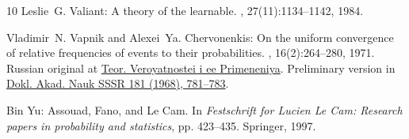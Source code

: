 \documentclass[11pt]{article}
\begin{document}
\begin{thebibliography}{10}
{\sc Leslie~G. Valiant}: A theory of the learnable.
, 27(11):1134--1142, 1984.
\newblock [\epfmtdoi{10.1145/1968.1972}]

{\sc Vladimir~N. Vapnik and Alexei~Ya. Chervonenkis}: On the uniform
  convergence of relative frequencies of events to their probabilities.
, 16(2):264--280, 1971.
\newblock Russian original at
  \href{https://www.mathnet.ru/links/3704b04dde93ca91eab24902517ad339/tvp2146.pdf}{Teor.
  Veroyatnostei i ee Primeneniya}. Preliminary version in
  \href{https://www.ams.org/mathscinet-getitem?mr=0231431}{Dokl. Akad. Nauk
  SSSR 181 (1968), 781--783}.
\newblock [\epfmtdoi{10.1137/1116025}]

{\sc Bin Yu}: {A}ssouad, {F}ano, and {L}e {C}am.
\newblock In {\em {F}estschrift for {L}ucien {L}e {C}am: {R}esearch papers in
  probability and statistics}, pp. 423--435. Springer, 1997.
\newblock [\epfmtdoi{10.1007/978-1-4612-1880-7\_29}]

\end{thebibliography}
\end{document}
